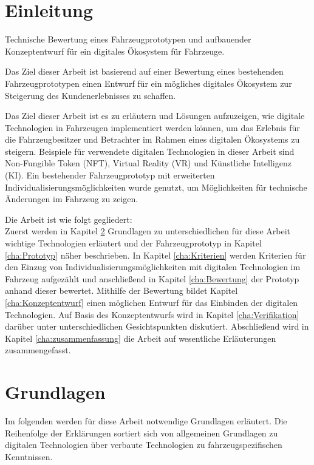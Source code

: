 \chapter{Einleitung}
\label{cha:Einleitung}
Technische Bewertung eines Fahrzeugprototypen und aufbauender Konzeptentwurf für ein digitales Ökosystem für Fahrzeuge.

Das Ziel dieser Arbeit ist basierend auf einer Bewertung eines bestehenden Fahrzeugprototypen einen Entwurf für ein mögliches digitales Ökosystem zur Steigerung des Kundenerlebnisses zu schaffen. 


Das Ziel dieser Arbeit ist es zu erläutern und Lösungen aufzuzeigen, wie digitale Technologien in Fahrzeugen implementiert werden können, um das Erlebnis für die Fahrzeugbesitzer und Betrachter im Rahmen eines digitalen Ökosystems zu steigern.
Beispiele für verwendete digitalen Technologien in dieser Arbeit sind Non-Fungible Token (NFT), Virtual Reality (VR) und Künstliche Intelligenz (KI).
Ein bestehender Fahrzeugprototyp mit erweiterten Individualisierungsmöglichkeiten wurde genutzt, um Möglichkeiten für technische Änderungen im Fahrzeug zu zeigen.

Die Arbeit ist wie folgt gegliedert:\\
Zuerst werden in Kapitel \ref{cha:Grundlagen} Grundlagen zu unterschiedlichen für diese Arbeit wichtige Technologien erläutert und der Fahrzeugprototyp in Kapitel \ref{cha:Prototyp} näher beschrieben. In Kapitel \ref{cha:Kriterien} werden Kriterien für den Einzug von Individualisierungsmöglichkeiten mit digitalen Technologien im Fahrzeug aufgezählt und anschließend in Kapitel \ref{cha:Bewertung} der Prototyp anhand dieser bewertet. Mithilfe der Bewertung bildet Kapitel \ref{cha:Konzeptentwurf} einen möglichen Entwurf für das Einbinden der digitalen Technologien. Auf Basis des Konzeptentwurfs wird in Kapitel \ref{cha:Verifikation} darüber unter unterschiedlichen Gesichtspunkten diskutiert. Abschließend wird in Kapitel \ref{cha:zusammenfassung} die Arbeit auf wesentliche Erläuterungen zusammengefasst.

\chapter{Grundlagen}
\label{cha:Grundlagen}
Im folgenden werden für diese Arbeit notwendige Grundlagen erläutert. Die Reihenfolge der Erklärungen sortiert sich von allgemeinen Grundlagen zu digitalen Technologien über verbaute Technologien zu fahrzeugspezifischen Kenntnissen.
